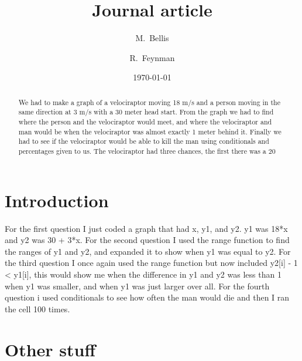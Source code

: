 \documentclass[twocolumn]{revtex4}
\begin{document}
\title{
Journal article
}

\author{M.~Bellis}
\author{R.~Feynman}

\date{\today}

\begin{abstract}


We had to make a graph of a velociraptor moving 18 m/s and a person moving in the same direction at 3 m/s with a 30 meter head start. From the graph we had to find where the person and the velociraptor would meet, and where the velociraptor and man would be when the velociraptor was almost exactly 1 meter behind it. Finally we had to see if the velociraptor would be able to kill the man using conditionals and percentages given to us. The velociraptor had three chances, the first there was a 20%
\end{abstract}

\maketitle

\section{Introduction}
For the first question I just coded a graph that had x, y1, and y2. y1 was 18*x and y2 was 30 + 3*x. For the second question I used the range function to find the ranges of y1 and y2, and expanded it to show when y1 was equal to y2. For the third question I once again used the range function but now included y2[i] - 1 < y1[i], this would show me when the difference in y1 and y2 was less than 1 when y1 was smaller, and when y1 was just larger over all. For the fourth question i used conditionals to see how often the man would die and then I ran the cell 100 times.

\section{Other stuff}
\end{document}

